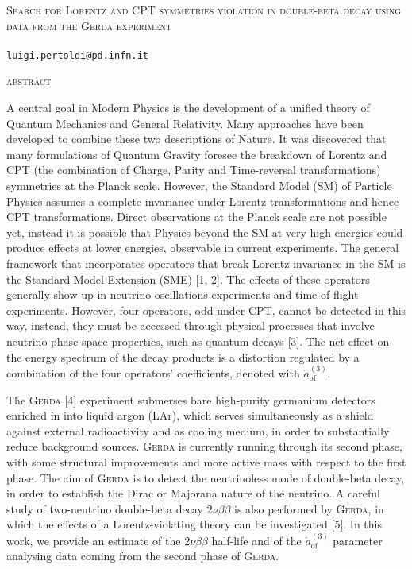 \documentclass[11pt, a4paper]{article}
\newcommand{\aof}{\mathring{a}_\text{of}^{(3)}}
\begin{document}
\begin{center}
	\Large{\textsc{Search for Lorentz and CPT symmetries violation in double-beta decay using data from the \textsc{Gerda} experiment}} \\
	\vspace{1cm}
	 \\
	\normalsize{\texttt{luigi.pertoldi@pd.infn.it}}
	\vspace{1cm}
\end{center}
\centerline{\large\textsc{abstract}}\vspace{8pt}
A central goal in Modern Physics is the development of a unified theory of Quantum Mechanics and General Relativity. Many approaches have been developed to combine these two descriptions of Nature. It was discovered that many formulations of Quantum Gravity foresee the breakdown of Lorentz and CPT (the combination of Charge, Parity and Time-reversal transformations) symmetries at the Planck scale. However, the Standard Model (SM) of Particle Physics assumes a complete invariance under Lorentz transformations and hence CPT transformations. Direct observations at the Planck scale are not possible yet, instead it is possible that Physics beyond the SM at very high energies could produce effects at lower energies, observable in current experiments. The general framework that incorporates operators that break Lorentz invariance in the SM is the Standard Model Extension (SME) [1, 2]. The effects of these operators generally show up in neutrino oscillations experiments and time-of-flight experiments. However, four operators, odd under CPT, cannot be detected in this way, instead, they must be accessed through physical processes that involve neutrino phase-space properties, such as quantum decays [3]. The net effect on the energy spectrum of the decay products is a distortion regulated by a combination of the four operators' coefficients, denoted with $\aof$.

The \textsc{Gerda} [4] experiment submerses bare high-purity germanium detectors enriched in  into liquid argon (LAr), which serves simultaneously as a shield against external radioactivity and as cooling medium, in order to substantially reduce background sources. \textsc{Gerda} is currently running through its second phase, with some structural improvements and more active mass with respect to the first phase.
The aim of \textsc{Gerda} is to detect the neutrinoless mode of double-beta decay, in order to establish the Dirac or Majorana nature of the neutrino. A careful study of two-neutrino double-beta decay $2\nu\beta\beta$ is also performed by \textsc{Gerda}, in which the effects of a Lorentz-violating theory can be investigated [5]. In this work, we provide an estimate of the $2\nu\beta\beta$ half-life and of the $\aof$ parameter analysing data coming from the second phase of \textsc{Gerda}.
\end{document}
